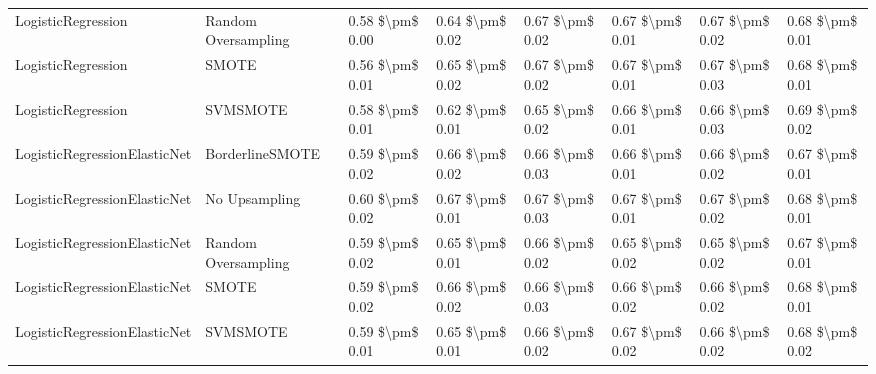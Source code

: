 \begin{tabular}{llllllll}
             LogisticRegression &           Random Oversampling & 0.58 \$\textbackslash pm\$ 0.00 &           0.64 \$\textbackslash pm\$ 0.02 &       0.67 \$\textbackslash pm\$ 0.02 &        0.67 \$\textbackslash pm\$ 0.01 &                         0.67 \$\textbackslash pm\$ 0.02 & 0.68 \$\textbackslash pm\$ 0.01 \\
             LogisticRegression &                         SMOTE & 0.56 \$\textbackslash pm\$ 0.01 &           0.65 \$\textbackslash pm\$ 0.02 &       0.67 \$\textbackslash pm\$ 0.02 &        0.67 \$\textbackslash pm\$ 0.01 &                         0.67 \$\textbackslash pm\$ 0.03 & 0.68 \$\textbackslash pm\$ 0.01 \\
             LogisticRegression &                      SVMSMOTE & 0.58 \$\textbackslash pm\$ 0.01 &           0.62 \$\textbackslash pm\$ 0.01 &       0.65 \$\textbackslash pm\$ 0.02 &        0.66 \$\textbackslash pm\$ 0.01 &                         0.66 \$\textbackslash pm\$ 0.03 & 0.69 \$\textbackslash pm\$ 0.02 \\
   LogisticRegressionElasticNet &               BorderlineSMOTE & 0.59 \$\textbackslash pm\$ 0.02 &           0.66 \$\textbackslash pm\$ 0.02 &       0.66 \$\textbackslash pm\$ 0.03 &        0.66 \$\textbackslash pm\$ 0.01 &                         0.66 \$\textbackslash pm\$ 0.02 & 0.67 \$\textbackslash pm\$ 0.01 \\
   LogisticRegressionElasticNet &                 No Upsampling & 0.60 \$\textbackslash pm\$ 0.02 &           0.67 \$\textbackslash pm\$ 0.01 &       0.67 \$\textbackslash pm\$ 0.03 &        0.67 \$\textbackslash pm\$ 0.01 &                         0.67 \$\textbackslash pm\$ 0.02 & 0.68 \$\textbackslash pm\$ 0.01 \\
   LogisticRegressionElasticNet &           Random Oversampling & 0.59 \$\textbackslash pm\$ 0.02 &           0.65 \$\textbackslash pm\$ 0.01 &       0.66 \$\textbackslash pm\$ 0.02 &        0.65 \$\textbackslash pm\$ 0.02 &                         0.65 \$\textbackslash pm\$ 0.02 & 0.67 \$\textbackslash pm\$ 0.01 \\
   LogisticRegressionElasticNet &                         SMOTE & 0.59 \$\textbackslash pm\$ 0.02 &           0.66 \$\textbackslash pm\$ 0.02 &       0.66 \$\textbackslash pm\$ 0.03 &        0.66 \$\textbackslash pm\$ 0.02 &                         0.66 \$\textbackslash pm\$ 0.02 & 0.68 \$\textbackslash pm\$ 0.01 \\
   LogisticRegressionElasticNet &                      SVMSMOTE & 0.59 \$\textbackslash pm\$ 0.01 &           0.65 \$\textbackslash pm\$ 0.01 &       0.66 \$\textbackslash pm\$ 0.02 &        0.67 \$\textbackslash pm\$ 0.02 &                         0.66 \$\textbackslash pm\$ 0.02 & 0.68 \$\textbackslash pm\$ 0.02 \\

\end{tabular}
